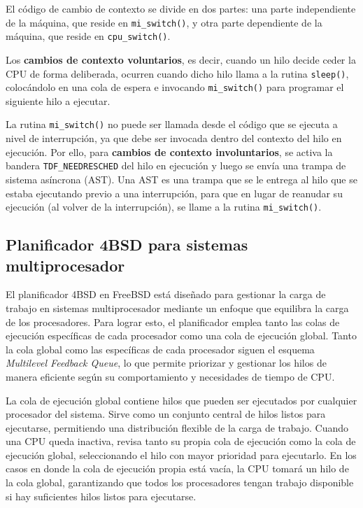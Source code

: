 El código de cambio de contexto se divide en dos partes: una parte independiente de la máquina, que reside en \verb|mi_switch()|, y otra parte dependiente de la máquina, que reside en \verb|cpu_switch()|.\par

Los \textbf{cambios de contexto voluntarios}, es decir, cuando un hilo decide ceder la CPU de forma deliberada, ocurren cuando dicho hilo llama a la rutina \verb|sleep()|, colocándolo en una cola de espera e invocando \verb|mi_switch()| para programar el siguiente hilo a ejecutar.\par

La rutina \verb|mi_switch()| no puede ser llamada desde el código que se ejecuta a nivel de interrupción, ya que debe ser invocada dentro del contexto del hilo en ejecución. Por ello, para \textbf{cambios de contexto involuntarios}, se activa la bandera \verb|TDF_NEEDRESCHED| del hilo en ejecución y luego se envía una trampa de sistema asíncrona (AST). Una AST es una trampa que se le entrega al hilo que se estaba ejecutando previo a una interrupción, para que en lugar de reanudar su ejecución (al volver de la interrupción), se llame a la rutina \verb|mi_switch()|.\par

\subsection{Planificador 4BSD para sistemas multiprocesador}

El planificador 4BSD en FreeBSD está diseñado para gestionar la carga de trabajo en sistemas multiprocesador mediante un enfoque que equilibra la carga de los procesadores. Para lograr esto, el planificador emplea tanto las colas de ejecución específicas de cada procesador como una cola de ejecución global. Tanto la cola global como las específicas de cada procesador siguen el esquema \textit{Multilevel Feedback Queue}, lo que permite priorizar y gestionar los hilos de manera eficiente según su comportamiento y necesidades de tiempo de CPU.

La cola de ejecución global contiene hilos que pueden ser ejecutados por cualquier procesador del sistema. Sirve como un conjunto central de hilos listos para ejecutarse, permitiendo una distribución flexible de la carga de trabajo. Cuando una CPU queda inactiva, revisa tanto su propia cola de ejecución como la cola de ejecución global, seleccionando el hilo con mayor prioridad para ejecutarlo. En los casos en donde la cola de ejecución propia está vacía, la CPU tomará un hilo de la cola global, garantizando que todos los procesadores tengan trabajo disponible si hay suficientes hilos listos para ejecutarse.

